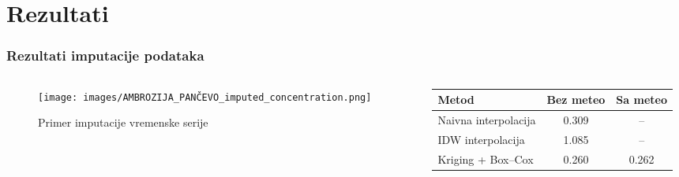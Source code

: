 \section{Rezultati}


\begin{frame}
    \frametitle{Rezultati imputacije podataka}

    \begin{columns}[T, totalwidth=\textwidth]

        \begin{column}{0.5\textwidth}
            \begin{figure}
                \centering
                \texttt{[image: images/AMBROZIJA\_PANČEVO\_imputed\_concentration.png]}
                \caption{Primer imputacije vremenske serije}
            \end{figure}
        \end{column}
        
        \begin{column}{0.48\textwidth}
            \centering
            \small
            \vspace{0.5cm}
            \begin{tabular}{lcc}
                \toprule
                \textbf{Metod} & \textbf{Bez meteo} & \textbf{Sa meteo} \\
                \midrule
                Naivna interpolacija & 0.309 & – \\
                IDW interpolacija & 1.085 & – \\
                Kriging + Box–Cox & 0.260 & 0.262 \\
                \bottomrule
            \end{tabular}
        \end{column}

    \end{columns}
\end{frame}


